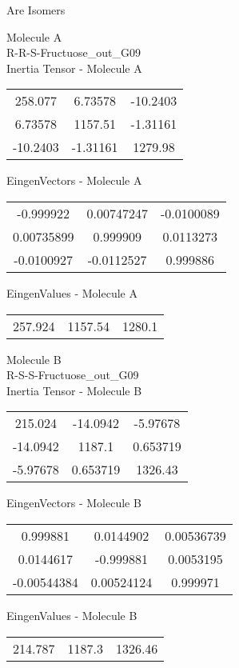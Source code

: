 \begin{center}
\vtab
\vtab
\textcolor{NavyBlue}{\Large Are Isomers}
\end{center}
\newpage
\begin{multicols}{2}
\begin{center}
Molecule A \\ 
R-R-S-Fructuose\_out\_G09
\\
Inertia Tensor - Molecule A \\
\vtab
\begin{tabular}{|c c c|}
258.077	 & 	6.73578	 & 	-10.2403	 \\
6.73578	 & 	1157.51	 & 	-1.31161	 \\
-10.2403	 & 	-1.31161	 & 	1279.98
\end{tabular}

\vtab
 EingenVectors - Molecule A     \\
\vtab
\begin{tabular}{|c c c|}
-0.999922	 & 	0.00747247	 & 	-0.0100089	 \\
0.00735899	 & 	0.999909	 & 	0.0113273	 \\
-0.0100927	 & 	-0.0112527	 & 	0.999886
\end{tabular}

\vtab
 EingenValues - Molecule A     \\
\vtab
\begin{tabular}{|c c c|}
257.924	 & 	1157.54	 & 	1280.1
\end{tabular}
\columnbreak

Molecule B \\ 
R-S-S-Fructuose\_out\_G09
\\
Inertia Tensor - Molecule B \\
\vtab
\begin{tabular}{|c c c|}
215.024	 & 	-14.0942	 & 	-5.97678	 \\
-14.0942	 & 	1187.1	 & 	0.653719	 \\
-5.97678	 & 	0.653719	 & 	1326.43
\end{tabular}

\vtab
 EingenVectors - Molecule B     \\
\vtab
\begin{tabular}{|c c c|}
0.999881	 & 	0.0144902	 & 	0.00536739	 \\
0.0144617	 & 	-0.999881	 & 	0.0053195	 \\
-0.00544384	 & 	0.00524124	 & 	0.999971
\end{tabular}

\vtab
 EingenValues - Molecule B     \\
\vtab
\begin{tabular}{|c c c|}
214.787	 & 	1187.3	 & 	1326.46
\end{tabular}

\end{center}
\end{multicols}
